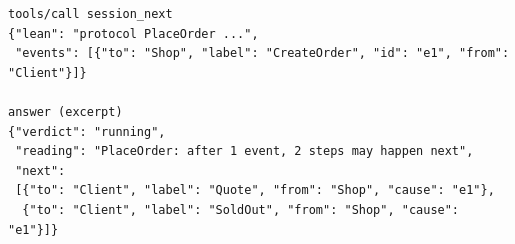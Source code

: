 \begin{lstlisting}[language={},basicstyle=\ttfamily\footnotesize,breaklines=true]
tools/call session_next
{"lean": "protocol PlaceOrder ...",
 "events": [{"to": "Shop", "label": "CreateOrder", "id": "e1", "from": "Client"}]}

answer (excerpt)
{"verdict": "running",
 "reading": "PlaceOrder: after 1 event, 2 steps may happen next",
 "next":
 [{"to": "Client", "label": "Quote", "from": "Shop", "cause": "e1"},
  {"to": "Client", "label": "SoldOut", "from": "Shop", "cause": "e1"}]}
\end{lstlisting}
